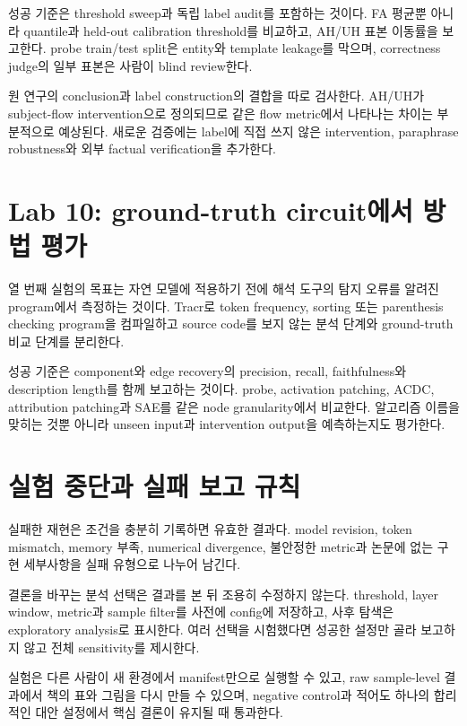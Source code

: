 성공 기준은 threshold sweep과 독립 label audit를 포함하는 것이다.
FA 평균뿐 아니라 quantile과 held-out calibration threshold를 비교하고, AH/UH 표본 이동률을 보고한다.
probe train/test split은 entity와 template leakage를 막으며, correctness judge의 일부 표본은 사람이 blind review한다.

원 연구의 conclusion과 label construction의 결합을 따로 검사한다.
AH/UH가 subject-flow intervention으로 정의되므로 같은 flow metric에서 나타나는 차이는 부분적으로 예상된다.
새로운 검증에는 label에 직접 쓰지 않은 intervention, paraphrase robustness와 외부 factual verification을 추가한다.

\section{Lab 10: ground-truth circuit에서 방법 평가}

열 번째 실험의 목표는 자연 모델에 적용하기 전에 해석 도구의 탐지 오류를 알려진 program에서 측정하는 것이다.
Tracr로 token frequency, sorting 또는 parenthesis checking program을 컴파일하고 source code를 보지 않는 분석 단계와 ground-truth 비교 단계를 분리한다.

성공 기준은 component와 edge recovery의 precision, recall, faithfulness와 description length를 함께 보고하는 것이다.
probe, activation patching, ACDC, attribution patching과 SAE를 같은 node granularity에서 비교한다.
알고리즘 이름을 맞히는 것뿐 아니라 unseen input과 intervention output을 예측하는지도 평가한다.

\section{실험 중단과 실패 보고 규칙}

실패한 재현은 조건을 충분히 기록하면 유효한 결과다.
model revision, token mismatch, memory 부족, numerical divergence, 불안정한 metric과 논문에 없는 구현 세부사항을 실패 유형으로 나누어 남긴다.

결론을 바꾸는 분석 선택은 결과를 본 뒤 조용히 수정하지 않는다.
threshold, layer window, metric과 sample filter를 사전에 config에 저장하고, 사후 탐색은 exploratory analysis로 표시한다.
여러 선택을 시험했다면 성공한 설정만 골라 보고하지 않고 전체 sensitivity를 제시한다.

\begin{studybox}[공통 통과 기준]
실험은 다른 사람이 새 환경에서 manifest만으로 실행할 수 있고, raw sample-level 결과에서 책의 표와 그림을 다시 만들 수 있으며, negative control과 적어도 하나의 합리적인 대안 설정에서 핵심 결론이 유지될 때 통과한다.
\end{studybox}
